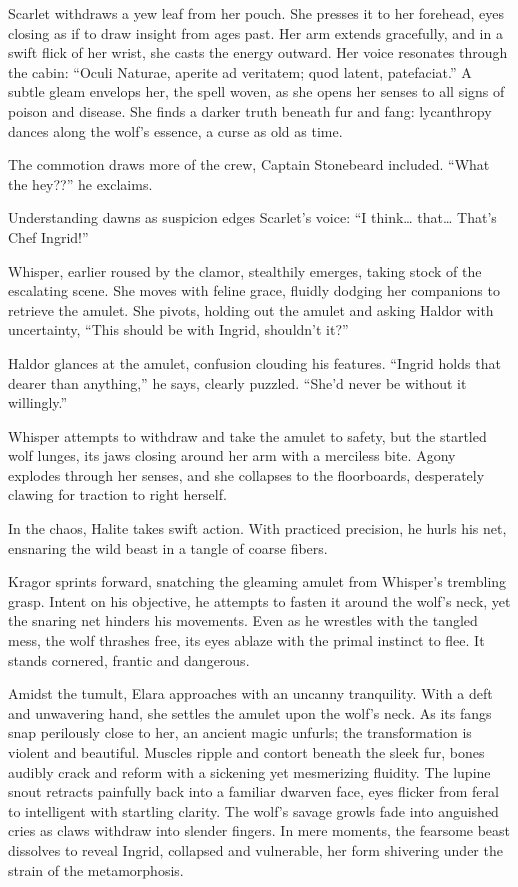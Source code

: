 \documentclass[
  letterpaper,12pt,twoside,twocolumn,openany,
  nodeprecatedcode,bg=full]{dndbook}
\begin{document}
Scarlet withdraws a yew leaf from her pouch. She presses it to her
forehead, eyes closing as if to draw insight from ages past. Her arm
extends gracefully, and in a swift flick of her wrist, she casts the
energy outward. Her voice resonates through the cabin: ``Oculi Naturae,
aperite ad veritatem; quod latent, patefaciat.'' A subtle gleam envelops
her, the spell woven, as she opens her senses to all signs of poison and
disease. She finds a darker truth beneath fur and fang: lycanthropy
dances along the wolf's essence, a curse as old as time.

The commotion draws more of the crew, Captain Stonebeard included.
``What the hey??'' he exclaims.

Understanding dawns as suspicion edges Scarlet's voice: ``I
think\ldots{} that\ldots{} That's Chef Ingrid!''

Whisper, earlier roused by the clamor, stealthily emerges, taking stock
of the escalating scene. She moves with feline grace, fluidly dodging
her companions to retrieve the amulet. She pivots, holding out the
amulet and asking Haldor with uncertainty, ``This should be with Ingrid,
shouldn't it?''

Haldor glances at the amulet, confusion clouding his features. ``Ingrid
holds that dearer than anything,'' he says, clearly puzzled. ``She'd
never be without it willingly.''

Whisper attempts to withdraw and take the amulet to safety, but the
startled wolf lunges, its jaws closing around her arm with a merciless
bite. Agony explodes through her senses, and she collapses to the
floorboards, desperately clawing for traction to right herself.

In the chaos, Halite takes swift action. With practiced precision, he
hurls his net, ensnaring the wild beast in a tangle of coarse fibers.

Kragor sprints forward, snatching the gleaming amulet from Whisper's
trembling grasp. Intent on his objective, he attempts to fasten it
around the wolf's neck, yet the snaring net hinders his movements. Even
as he wrestles with the tangled mess, the wolf thrashes free, its eyes
ablaze with the primal instinct to flee. It stands cornered, frantic and
dangerous.

Amidst the tumult, Elara approaches with an uncanny tranquility. With a
deft and unwavering hand, she settles the amulet upon the wolf's neck.
As its fangs snap perilously close to her, an ancient magic unfurls; the
transformation is violent and beautiful. Muscles ripple and contort
beneath the sleek fur, bones audibly crack and reform with a sickening
yet mesmerizing fluidity. The lupine snout retracts painfully back into
a familiar dwarven face, eyes flicker from feral to intelligent with
startling clarity. The wolf's savage growls fade into anguished cries as
claws withdraw into slender fingers. In mere moments, the fearsome beast
dissolves to reveal Ingrid, collapsed and vulnerable, her form shivering
under the strain of the metamorphosis.
\end{document}
